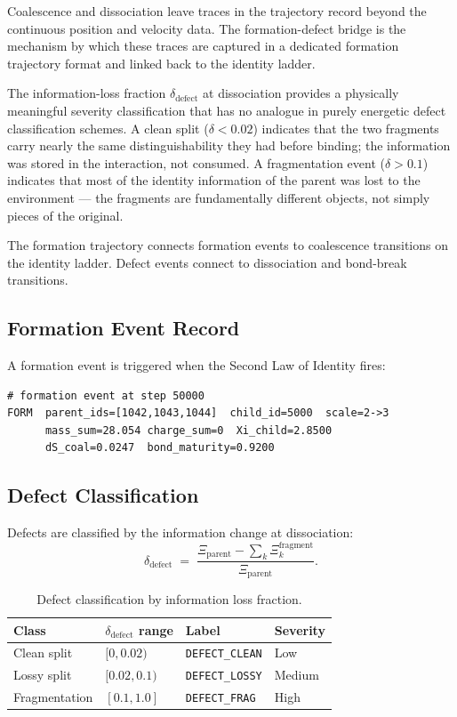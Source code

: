 \documentclass[11pt,a4paper]{article}
\newcommand{\Rec}{\Xi}
\begin{document}
Coalescence and dissociation leave traces in the trajectory record beyond
the continuous position and velocity data.  The formation-defect bridge is
the mechanism by which these traces are captured in a dedicated formation
trajectory format and linked back to the identity ladder.

The information-loss fraction $\delta_{\mathrm{defect}}$ at dissociation
provides a physically meaningful severity classification that has no analogue
in purely energetic defect classification schemes.  A clean split
($\delta < 0.02$) indicates that the two fragments carry nearly the same
distinguishability they had before binding; the information was stored in
the interaction, not consumed.  A fragmentation event ($\delta > 0.1$)
indicates that most of the identity information of the parent was lost to
the environment --- the fragments are fundamentally different objects,
not simply pieces of the original.

The formation trajectory connects formation events to coalescence transitions
on the identity ladder.  Defect events connect to dissociation and bond-break
transitions.

\subsection{Formation Event Record}

A formation event is triggered when the Second Law of Identity fires:
\begin{lstlisting}
# formation event at step 50000
FORM  parent_ids=[1042,1043,1044]  child_id=5000  scale=2->3
      mass_sum=28.054 charge_sum=0  Xi_child=2.8500
      dS_coal=0.0247  bond_maturity=0.9200
\end{lstlisting}

\subsection{Defect Classification}

Defects are classified by the information change at dissociation:
\[
  \delta_{\mathrm{defect}} \;=\;
  \frac{\Rec_{\mathrm{parent}} -
        \sum_{k} \Rec_k^{\mathrm{fragment}}}
       {\Rec_{\mathrm{parent}}} .
\]
\begin{table}[H]
\centering
\caption{Defect classification by information loss fraction.}
\label{tab:defect}
\begin{tabular}{@{}llll@{}}
\toprule
Class & $\delta_{\mathrm{defect}}$ range & Label & Severity \\
\midrule
Clean split   & $[0, 0.02)$  & \texttt{DEFECT\_CLEAN}  & Low \\
Lossy split   & $[0.02, 0.1)$& \texttt{DEFECT\_LOSSY}  & Medium \\
Fragmentation & $[0.1, 1.0]$ & \texttt{DEFECT\_FRAG}   & High \\
\bottomrule
\end{tabular}
\end{table}
\end{document}
